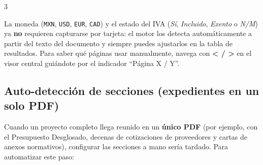\documentclass[12pt, a4paper, oneside]{report}
\newcommand{\btn}[1]{\texttt{\colorbox{vino!15}{\strut#1}}}
\newcommand{\campo}[1]{\textit{#1}}
\begin{document}
\begin{pasobox}{3}
\end{pasobox}

\begin{notabox}
La moneda (\texttt{MXN}, \texttt{USD}, \texttt{EUR}, \texttt{CAD}) y el estado del
IVA (\textit{Sí}, \textit{Incluido}, \textit{Exento} o \textit{N/M}) ya \textbf{no}
requieren capturarse por tarjeta: el motor los detecta automáticamente a partir del
texto del documento y siempre puedes ajustarlos en la tabla de resultados. Para saber
qué páginas usar manualmente, navega con \textbf{< / >} en el visor central guiándote
por el indicador ``Página X / Y''.
\end{notabox}

\subsection{Auto-detección de secciones (expedientes en un solo PDF)}
\label{sec:auto_detectar}

Cuando un proyecto completo llega reunido en un \textbf{único PDF} (por ejemplo,
con el Presupuesto Desglosado, decenas de cotizaciones de proveedores y cartas de
anexos normativos), configurar las secciones a mano sería tardado. Para automatizar
este paso:
\end{document}
